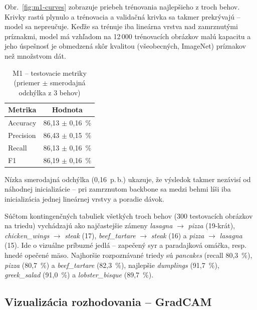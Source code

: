 Obr.~\ref{fig:m1-curves} zobrazuje priebeh trénovania najlepšieho z troch
behov. Krivky rastú plynulo a trénovacia a validačná krivka sa takmer
prekrývajú -- model sa nepreučuje. Keďže sa trénuje iba lineárna vrstva nad
zamrznutými príznakmi, model má vzhľadom na 12\,000 trénovacích obrázkov
malú kapacitu a jeho úspešnosť je obmedzená skôr kvalitou (všeobecných,
ImageNet) príznakov než množstvom dát.


\begin{table}[H]
    \centering
    \caption{M1 -- testovacie metriky (priemer $\pm$ smerodajná odchýlka z 3 behov)}
    \label{tab:m1-metrics}
    \begin{tabular}{lc}
        \toprule
        Metrika & Hodnota \\
        \midrule
        Accuracy  & 86,13 $\pm$ 0,16~\% \\
        Precision & 86,43 $\pm$ 0,15~\% \\
        Recall    & 86,13 $\pm$ 0,16~\% \\
        F1        & 86,19 $\pm$ 0,16~\% \\
        \bottomrule
    \end{tabular}
\end{table}

Nízka smerodajná odchýlka (0,16~p.\,b.) ukazuje, že výsledok takmer
nezávisí od náhodnej inicializácie -- pri zamrznutom backbone sa medzi
behmi líši iba inicializácia jednej lineárnej vrstvy a poradie dávok.


Súčtom kontingenčných tabuliek všetkých troch behov (300 testovacích
obrázkov na triedu) vychádzajú ako najčastejšie zámeny \emph{lasagna}
$\rightarrow$ \emph{pizza} (19-krát), \emph{chicken\_wings} $\rightarrow$
\emph{steak} (17), \emph{beef\_tartare} $\rightarrow$ \emph{steak} (16)
a \emph{pizza} $\rightarrow$ \emph{lasagna} (15). Ide o vizuálne príbuzné
jedlá -- zapečený syr a paradajková omáčka, resp. hnedé opečené mäso.
Najhoršie rozpoznávané triedy sú \emph{pancakes} (recall 80,3~\%),
\emph{pizza} (80,7~\%) a \emph{beef\_tartare} (82,3~\%), najlepšie
\emph{dumplings} (91,7~\%), \emph{greek\_salad} (91,0~\%)
a \emph{lobster\_bisque} (89,7~\%).

\subsection{Vizualizácia rozhodovania -- GradCAM}

